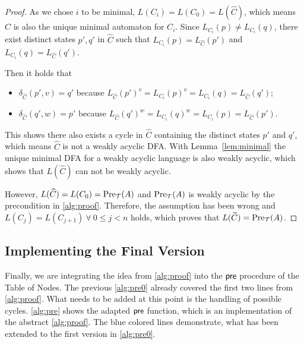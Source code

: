 \begin{proof}
As we chose $i$ to be minimal, $L(C_{i}) = L(C_{0}) = L(\widehat{C})$, which means $\widehat{C}$ is also the unique minimal automaton for $C_{i}$. Since $L_{C_{i}}(p) \neq L_{C_{i}}(q)$, there exist distinct states $p',q'$ in $\widehat{C}$ such that $L_{C_{i}}(p) = L_{\widehat{C}}(p')$ and $L_{C_{i}}(q) = L_{\widehat{C}}(q')$. 

Then it holds that
\begin{itemize}[-,noitemsep]
\item $\delta_{\widehat{C}}(p',v) = q'$ because $L_{\widehat{C}}(p')^{v} = L_{C_{i}}(p)^{v} = L_{C_{i}}(q) = L_{\widehat{C}}(q')$;
\item $\delta_{\widehat{C}}(q',w) = p'$ because
$L_{\widehat{C}}(q')^{w} = L_{C_{i}}(q)^{w} = L_{C_{i}}(p) = L_{\widehat{C}}(p')$.
\end{itemize}
%

This shows there also exists a cycle in $\widehat{C}$ containing the distinct states $p'$ and $q'$, which means $\widehat{C}$ is not a weakly acyclic DFA. 
With Lemma~\autoref{lem:minimal} the unique minimal DFA for a weakly acyclic language is also weakly acyclic, which shows that $L(\widehat{C})$ can not be weakly acyclic.

However, $L(\widehat{C}) = L(C_{0}) = \operatorname{\text{Pre}}_{\mathcal{T}}(A)$ and $\operatorname{\text{Pre}}_{\mathcal{T}}(A)$ is weakly acyclic by the precondition in \autoref{alg:proof}. Therefore, the assumption has been wrong and $L(C_{j}) = L(C_{j+1}) \ \forall \ 0 \le j < n$ holds, which proves that $L(\widetilde{C}) = \operatorname{\text{Pre}}_{\mathcal{T}}(A)$. 



\end{proof}

\subsection{Implementing the Final Version}
Finally, we are integrating the idea from \autoref{alg:proof} into the $\operatorname{\textsf{pre}}$ procedure of the Table of Nodes. The previous \autoref{alg:pre0} already covered the first two lines from \autoref{alg:proof}. What needs to be added at this point is the handling of possible cycles.
\autoref{alg:pre} shows the adapted $\operatorname{\textsf{pre}}$ function, which is an implementation of the abstract \autoref{alg:proof}. The blue colored lines demonstrate, what has been extended to the first version in \autoref{alg:pre0}.


